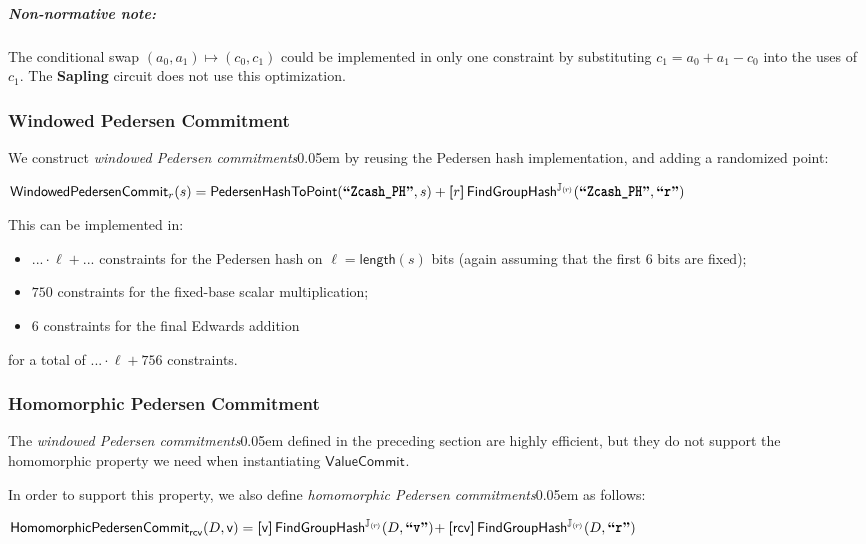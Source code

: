 \documentclass{article}
\let\oldtexttt\texttt
\renewcommand{\texttt}[1]{\scalebox{0.97}[1.07]{\oldtexttt{#1}}}
\newcommand{\introlist}{\needspace{15ex}}
\newcommand{\introsection}{\needspace{35ex}}
\numberwithin{theorem}{subsection}
\newcommand{\term}[1]{\textsl{#1}\kern 0.05em\xspace}
\newcommand{\titleterm}[1]{#1}
\newcommand{\termbf}[1]{\textbf{#1}\xspace}
\newcommand{\Sapling}{\termbf{Sapling}}
\newcommand{\windowedPedersenCommitments}{\term{windowed Pedersen commitments}}
\newcommand{\WindowedPedersenCommitment}{\titleterm{Windowed Pedersen Commitment}}
\newcommand{\homomorphicPedersenCommitments}{\term{homomorphic Pedersen commitments}}
\newcommand{\HomomorphicPedersenCommitment}{\titleterm{Homomorphic Pedersen Commitment}}
\newcommand{\length}{\mathsf{length}}
\newcommand{\ascii}[1]{\textbf{``\texttt{#1}''}}
\newcommand{\smult}{\!\cdot\!}
\newcommand{\scalarmult}[2]{\boldsymbol{[}{#1}\boldsymbol{]}\,{#2}}
\newcommand{\ValueCommitAlg}{\mathsf{ValueCommit}}
\newcommand{\ValueCommit}[1]{\ValueCommitAlg_{#1}}
\newcommand{\Value}{\mathsf{v}}
\newcommand{\ValueCommitRand}{\mathsf{rcv}}
\newcommand{\subgroupr}{(\kern-0.075emr\kern-0.075em)}
\newcommand{\FindGroupHash}{\mathsf{FindGroupHash}}
\newcommand{\SubgroupJ}{\mathbb{J}_{\subgroupr}}
\newcommand{\FindGroupJHash}{\FindGroupHash^{\SubgroupJ}}
\newcommand{\FindGroupJHashOf}[1]{\FindGroupJHash\!\left({#1}\right)\!}
\newcommand{\PedersenHashToPoint}{\mathsf{PedersenHashToPoint}}
\newcommand{\WindowedPedersenCommitAlg}{\mathsf{WindowedPedersenCommit}}
\newcommand{\WindowedPedersenCommit}[1]{\WindowedPedersenCommitAlg_{#1}}
\newcommand{\HomomorphicPedersenCommitAlg}{\mathsf{HomomorphicPedersenCommit}}
\newcommand{\HomomorphicPedersenCommit}[1]{\HomomorphicPedersenCommitAlg_{#1}}
\newcommand{\nnote}[1]{\subparagraph{Non-normative note:}{#1}}
\begin{document}
{\nnote{The conditional swap $(a_0, a_1) \mapsto (c_0, c_1)$ could be implemented
in only one constraint by substituting $c_1 = a_0 + a_1 - c_0$ into the
uses of $c_1$. The \Sapling circuit does not use this optimization.}


\introsection
\subsubsection{\WindowedPedersenCommitment} \label{cctwindowedcommit}

We construct \windowedPedersenCommitments by reusing the Pedersen hash
implementation, and adding a randomized point:

\begin{formulae}
  \item $\WindowedPedersenCommit{r}(s) =
           \PedersenHashToPoint(\ascii{Zcash\_PH}, s) + \scalarmult{r}{\FindGroupJHashOf{\ascii{Zcash\_PH}, \ascii{r}}}$
\end{formulae}

\introlist
This can be implemented in:
\begin{itemize}
  \item $... \smult \ell + ...$ constraints for the Pedersen hash on
        $\ell = \length(s)$ bits (again assuming that the first $6$ bits are fixed);
  \item $750$ constraints for the fixed-base scalar multiplication;
  \item $6$ constraints for the final Edwards addition
\end{itemize}
for a total of $... \smult \ell + 756$ constraints.


\subsubsection{\HomomorphicPedersenCommitment} \label{ccthomomorphiccommit}

The \windowedPedersenCommitments defined in the preceding section are
highly efficient, but they do not support the homomorphic property we
need when instantiating $\ValueCommit{}$.

\introlist
In order to support this property, we also define \homomorphicPedersenCommitments
as follows:

\begin{formulae}
  \item $\HomomorphicPedersenCommit{\ValueCommitRand}(D, \Value) =
           \scalarmult{\Value}{\FindGroupJHashOf{D, \ascii{v}}} + \scalarmult{\ValueCommitRand}{\FindGroupJHashOf{D, \ascii{r}}}$
\end{formulae}

}
\end{document}
